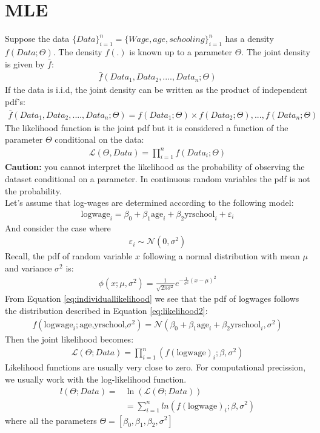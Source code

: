 \documentclass[11pt,letterpaper]{article}
\begin{document}
\section{MLE}
Suppose the data $\{Data\}_{i=1}^n=\{Wage,age,schooling\}_{i=1}^n$ has a density $f(Data;\Theta)$. The density $f(.)$ is known up to a parameter $\Theta$. The joint density is given by $\bar f:$
\begin{align}
    \bar f(Data_1,Data_2,....,Data_n;\Theta)
\end{align}
If the data is i.i.d, the joint density can be written as the product of independent pdf's:
\begin{align}
    \bar f(Data_1,Data_2,....,Data_n;\Theta)=
    f(Data_1;\Theta)\times f(Data_2;\Theta),...,f(Data_n;\Theta)
\end{align}
The likelihood function is the joint pdf but it is considered a function of the parameter $\Theta$ conditional on the data:
\begin{align}
    \mathcal{L}(\Theta,Data)=\prod_{i=1}^nf(Data_i;\Theta)
\end{align}
\textbf{Caution:} you cannot interpret the likelihood as the probability of observing the dataset conditional on a parameter. In continuous random variables the pdf is not the probability. 
\\
Let's assume that log-wages are determined according to the following model:
\begin{align}\label{eq:individuallikelihood}
    \text{logwage}_i=\beta_0+\beta_1\text{age}_i+\beta_2\text{yrschool}_i+\varepsilon_i
\end{align}
And consider the case where
\begin{align}
    \varepsilon_i\sim \mathcal{N}(0,\sigma^2)
\end{align}
Recall, the pdf of random variable $x$ following a normal distribution with mean $\mu$ and variance $\sigma^2$ is:
\begin{align}
    \phi(x;\mu,\sigma^2)=\frac{1}{\sqrt{2\pi \sigma^2}}e^{-\frac{1}{\sigma^2}\left(x-\mu\right)^2}
\end{align}
From Equation \ref{eq:individuallikelihood} we see that the pdf of logwages follows the distribution described in Equation \ref{eq:likelihood2}:
\begin{align}\label{eq:likelihood2}
    f(\text{logwage}_i;\text{age,yrschool,}\sigma^2)=\mathcal{N}\left(\beta_0+\beta_1\text{age}_i+\beta_2\text{yrschool}_i,\sigma^2\right)
\end{align}
Then the joint likelihood becomes:
\begin{align}
    \mathcal{L}(\Theta;Data)=\prod_{i=1}^n(f(\text{logwage})_i;\beta,\sigma^2)
\end{align}
Likelihood functions are usually very close to zero. For computational precission, we usually work with the log-likelihood function. 
\begin{align}
    l(\Theta;Data)= & \ln\left(\mathcal{L}(\Theta;Data)\right)\nonumber \\[0.2in]
    & = \sum_{i=1}^nln(f(\text{logwage})_i;\beta,\sigma^2)
\end{align}
where all the parameters $\Theta=\left[\beta_0,\beta_1,\beta_2,\sigma^2 \right]$
\end{document}
